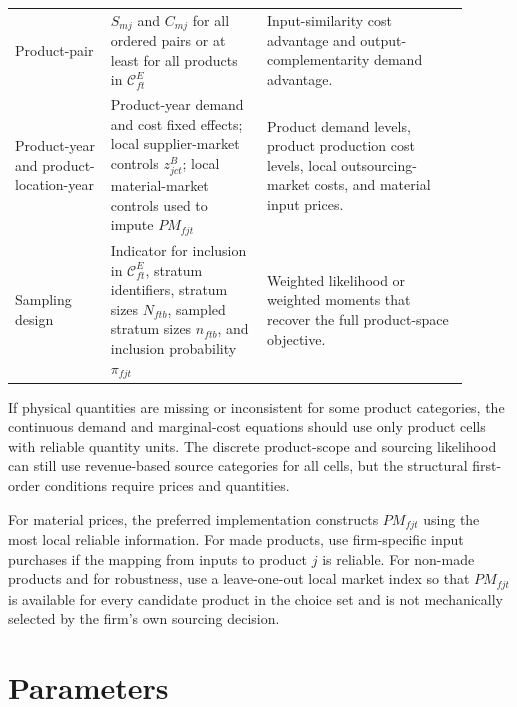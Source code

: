 \documentclass[11pt,a4paper]{article}
\newcommand{\mc}{\mathcal}
\begin{document}
\begin{longtable}{L{0.19\linewidth}L{0.31\linewidth}L{0.40\linewidth}}
\addlinespace
Product-pair & $S_{mj}$ and $C_{mj}$ for all ordered pairs or at least for all products in $\mc{C}^{E}_{ft}$ & Input-similarity cost advantage and output-complementarity demand advantage. \\
\addlinespace
Product-year and product-location-year & Product-year demand and cost fixed effects; local supplier-market controls $z^B_{jct}$; local material-market controls used to impute $PM_{fjt}$ & Product demand levels, product production cost levels, local outsourcing-market costs, and material input prices. \\
\addlinespace
Sampling design & Indicator for inclusion in $\mc{C}^{E}_{ft}$, stratum identifiers, stratum sizes $N_{ftb}$, sampled stratum sizes $n_{ftb}$, and inclusion probability $\pi_{fjt}$ & Weighted likelihood or weighted moments that recover the full product-space objective. \\
\bottomrule
\end{longtable}

If physical quantities are missing or inconsistent for some product categories, the continuous demand and marginal-cost equations should use only product cells with reliable quantity units. The discrete product-scope and sourcing likelihood can still use revenue-based source categories for all cells, but the structural first-order conditions require prices and quantities.

For material prices, the preferred implementation constructs $PM_{fjt}$ using the most local reliable information. For made products, use firm-specific input purchases if the mapping from inputs to product $j$ is reliable. For non-made products and for robustness, use a leave-one-out local market index so that $PM_{fjt}$ is available for every candidate product in the choice set and is not mechanically selected by the firm's own sourcing decision.

\section{Parameters}
\label{sec:parameters}
\end{document}
